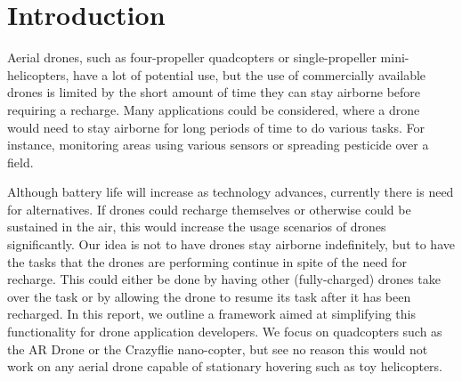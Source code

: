 \section{Introduction}
Aerial drones, such as four-propeller quadcopters or single-propeller mini-helicopters, have a lot of potential use, but the use of commercially available drones is limited by the short amount of time they can stay airborne before requiring a recharge. Many applications could be considered, where a drone would need to stay airborne for long periods of time to do various tasks. For instance, monitoring areas using various sensors or spreading pesticide over a field.

Although battery life will increase as technology advances, currently there is need for alternatives. If drones could recharge themselves or otherwise could be sustained in the air, this would increase the usage scenarios of drones significantly. Our idea is not to have drones stay airborne indefinitely, but to have the tasks that the drones are performing continue in spite of the need for recharge. This could either be done by having other (fully-charged) drones take over the task or by allowing the drone to resume its task after it has been recharged. In this report, we outline a framework aimed at simplifying this functionality for drone application developers. We focus on quadcopters such as the AR Drone or the Crazyflie nano-copter, but see no reason this would not work on any aerial drone capable of stationary hovering such as toy helicopters.